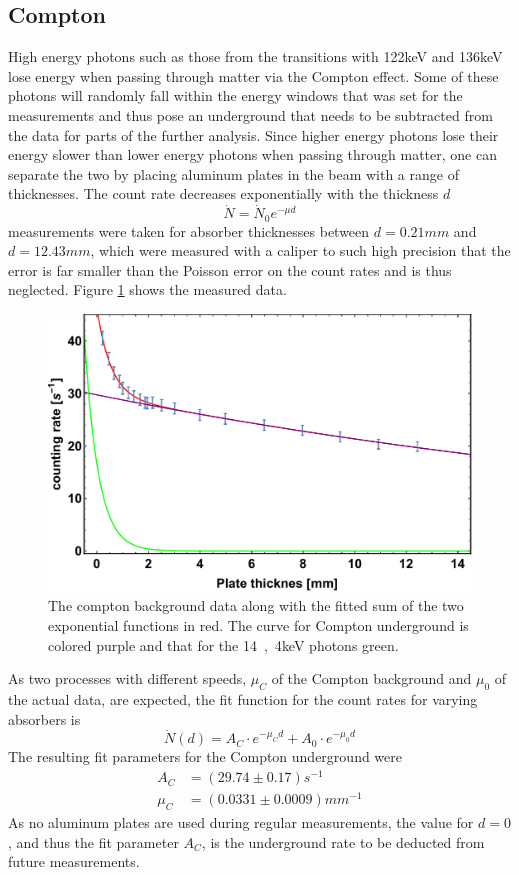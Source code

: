 \subsection{Compton}
High energy photons such as those from the transitions with \unit{122}{keV} and \unit{136}{keV} lose energy when passing through matter via the Compton effect. Some of these photons will randomly fall within the energy windows that was set for the measurements and thus pose an underground that needs to be subtracted from the data for parts of the further analysis. Since higher energy photons lose their energy slower than lower energy photons when passing through matter, one can separate the two by placing aluminum plates in the beam with a range of thicknesses. The count rate decreases exponentially with the thickness $d$ 
\begin{equation}
\dot{N}=\dot{N}_0e^{-\mu d}
\end{equation}
measurements were taken for absorber thicknesses between $d=\unit{0.21}{mm}$ and $d=\unit{12.43}{mm}$, which were measured with a caliper to such high precision that the error is far smaller than the Poisson error on the count rates and is thus neglected. Figure \ref{fig:comptonbackground} shows the measured data.
\begin{figure}
\centering
\includegraphics[width=1.0\linewidth]{graphics/comptonbackground}
\caption[Compton background data]{The compton background data along with the fitted sum of the two exponential functions in red. The curve for Compton underground is colored purple and that for the \unit{14,4}{keV} photons green.}
\label{fig:comptonbackground}
\end{figure}
As two processes with different speeds, $\mu_{C}$ of the Compton background and $\mu_0$ of the actual data, are expected, the fit function for the count rates for varying absorbers is
\begin{equation}
\dot{N}(d)=A_C\cdot e^{-\mu_C d}+A_0\cdot e^{-\mu_0 d}
\end{equation}
The resulting fit parameters for the Compton underground were
\begin{align}
A_C&=\unit{(29.74\pm0.17)}{s^{-1}}\\
\mu_C&=\unit{(0.0331\pm0.0009)}{mm^{-1}}
\end{align}
As no aluminum plates are used during regular measurements, the value for $d=0$, and thus the fit parameter $A_C$, is the underground rate to be deducted from future measurements.


